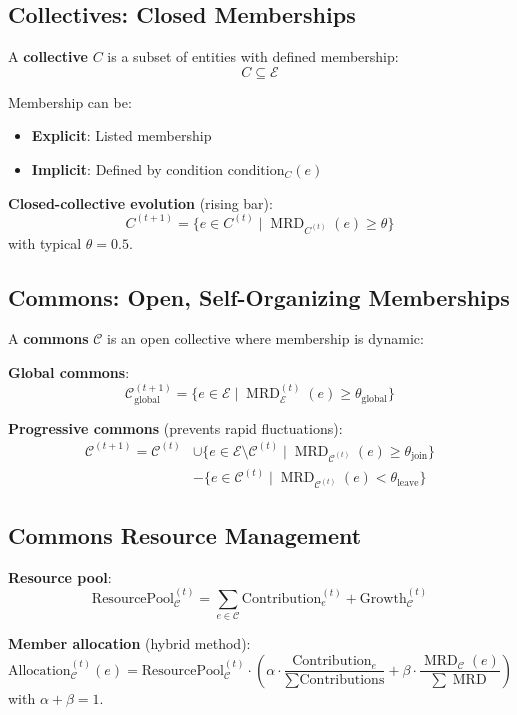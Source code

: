 \documentclass[11pt,a4paper]{article}
\theoremstyle{definition}
\theoremstyle{remark}
\newcommand{\E}{\mathcal{E}}
\newcommand{\C}{\mathcal{C}}
\DeclareMathOperator{\MRD}{MRD}
\begin{document}
\subsection{Collectives: Closed Memberships}

A \textbf{collective} $C$ is a subset of entities with defined membership:
\[ C \subseteq \E \]

Membership can be:
\begin{itemize}
\item \textbf{Explicit}: Listed membership
\item \textbf{Implicit}: Defined by condition $\text{condition}_C(e)$
\end{itemize}

\textbf{Closed-collective evolution} (rising bar):
\[ C^{(t+1)} = \{ e \in C^{(t)} \mid \MRD_{C^{(t)}}(e) \ge \theta \} \]
with typical $\theta = 0.5$.

\subsection{Commons: Open, Self-Organizing Memberships}

A \textbf{commons} $\C$ is an open collective where membership is dynamic:

\textbf{Global commons}:
\[ \C_{\text{global}}^{(t+1)} = \{ e \in \E \mid \MRD_\E^{(t)}(e) \ge \theta_{\text{global}} \} \]

\textbf{Progressive commons} (prevents rapid fluctuations):
\begin{align*}
\C^{(t+1)} = \C^{(t)} &\cup \{ e \in \E \setminus \C^{(t)} \mid \MRD_{\C^{(t)}}(e) \ge \theta_{\text{join}} \} \\
&- \{ e \in \C^{(t)} \mid \MRD_{\C^{(t)}}(e) < \theta_{\text{leave}} \}
\end{align*}

\subsection{Commons Resource Management}

\textbf{Resource pool}:
\[ \text{ResourcePool}_\C^{(t)} = \sum_{e \in \C} \text{Contribution}_e^{(t)} + \text{Growth}_\C^{(t)} \]

\textbf{Member allocation} (hybrid method):
\[ \text{Allocation}_\C^{(t)}(e) = \text{ResourcePool}_\C^{(t)} \cdot \left( \alpha \cdot \frac{\text{Contribution}_e}{\sum \text{Contributions}} + \beta \cdot \frac{\MRD_\C(e)}{\sum \MRD} \right) \]
with $\alpha + \beta = 1$.
\end{document}
